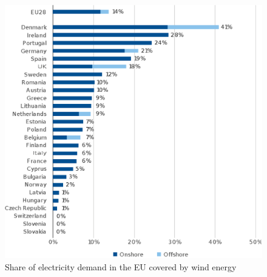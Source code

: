 \begin{figure}[htb]
	\caption{Share of electricity demand in the EU covered by wind energy}
	\begin{center}
		\includegraphics[scale=0.5]{Images/EUrank.eps}
	\end{center}
	\label{fig: EUrank}
\end{figure}


	
